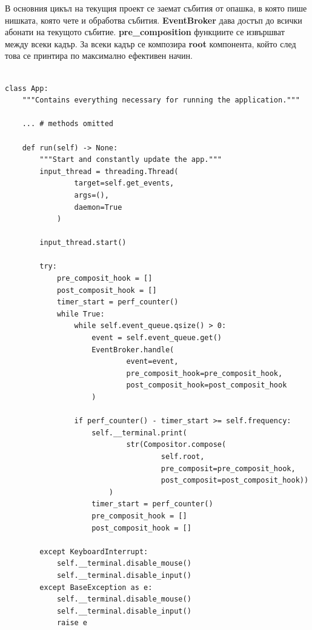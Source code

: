         В основния цикъл на текущия проект се заемат събития от опашка, в която
        пише нишката, която чете и обработва събития. \textbf{EventBroker}
        дава достъп до всички абонати на текущото събитие.
        \textbf{pre\_composition} функциите се извършват между всеки кадър. За
        всеки кадър се композира \textbf{root} компонента, който след това се 
        принтира по максимално ефективен начин.

        \begin{lstlisting}[style=py]
            
class App:
    """Contains everything necessary for running the application."""

    ... # methods omitted

    def run(self) -> None:
        """Start and constantly update the app."""
        input_thread = threading.Thread(
                target=self.get_events,
                args=(),
                daemon=True
            )

        input_thread.start()

        try:
            pre_composit_hook = []
            post_composit_hook = []
            timer_start = perf_counter()
            while True:
                while self.event_queue.qsize() > 0:
                    event = self.event_queue.get()
                    EventBroker.handle(
                            event=event,
                            pre_composit_hook=pre_composit_hook,
                            post_composit_hook=post_composit_hook
                    )

                if perf_counter() - timer_start >= self.frequency:
                    self.__terminal.print(
                            str(Compositor.compose(
                                    self.root,
                                    pre_composit=pre_composit_hook,
                                    post_composit=post_composit_hook))
                        )
                    timer_start = perf_counter()
                    pre_composit_hook = []
                    post_composit_hook = []

        except KeyboardInterrupt:
            self.__terminal.disable_mouse()
            self.__terminal.disable_input()
        except BaseException as e:
            self.__terminal.disable_mouse()
            self.__terminal.disable_input()
            raise e

        \end{lstlisting}
        
